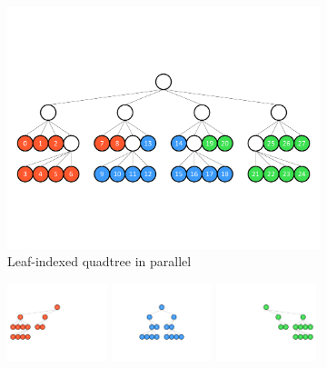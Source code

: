 \begin{figure}
    \centering
    \begin{subfigure}[t]{1\textwidth}
        \centering
        \includegraphics[width=\textwidth, clip=true, trim={0 150 0 150}]{figures/parallel_leaf_indexed_tree.pdf}
        \caption{Leaf-indexed quadtree in parallel}
        \label{subfig:leaf-indexed-quadtree}
    \end{subfigure}
    \begin{subfigure}[t]{1\textwidth}
        \centering
        \includegraphics[width=0.32\textwidth, clip=true, trim={20 160 370 160}]{figures/parallel_path_indexed_tree0.pdf}
        \includegraphics[width=0.32\textwidth, clip=true, trim={195 160 195 160}]{figures/parallel_path_indexed_tree1.pdf}
        \includegraphics[width=0.32\textwidth, clip=true, trim={370 160 20 160}]{figures/parallel_path_indexed_tree2.pdf}

\end{subfigure}
\end{figure}
